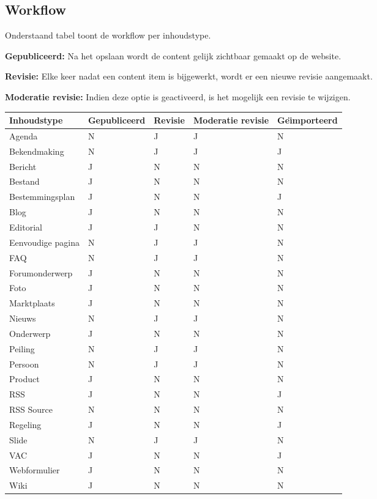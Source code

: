 \clearpage
\subsection{Workflow}\label{workflow}

Onderstaand tabel toont de workflow per inhoudstype. 

\textbf{Gepubliceerd:} Na het opslaan wordt de content gelijk zichtbaar gemaakt op de website.

\textbf{Revisie:} Elke keer nadat een content item is bijgewerkt, wordt er een nieuwe revisie aangemaakt.

\textbf{Moderatie revisie:} Indien deze optie is geactiveerd, is het mogelijk een revisie te wijzigen.

\begin{tabularx}{\textwidth}{ | p{5cm} |X|X|X|X| }
  \hline
  Inhoudstype & Gepubliceerd & Revisie & Moderatie revisie & Ge{\"\i}mporteerd \\ \hline
  Agenda & N & J  & J & N  \\ \hline
  Bekendmaking & N & J  & J & J  \\ \hline
  Bericht  & J & N  & N & N  \\ \hline
  Bestand  & J & N  & N & N  \\ \hline
  Bestemmingsplan  & J & N  & N & J  \\ \hline
  Blog  & J & N  & N & N  \\ \hline
  Editorial  & J & J  & N & N  \\ \hline
  Eenvoudige pagina  & N & J  & J & N  \\ \hline
  FAQ  & N & J  & J & N  \\ \hline
  Forumonderwerp  & J & N  & N & N  \\ \hline
  Foto  & J & N  & N & N  \\ \hline
  Marktplaats  & J & N  & N & N  \\ \hline
  Nieuws  & N & J  & J & N  \\ \hline
  Onderwerp  & J & N  & N & N  \\ \hline
  Peiling  & N & J  & J & N  \\ \hline
  Persoon  & N & J  & J & N  \\ \hline
  Product  & J & N  & N & N  \\ \hline
  RSS  & J & N  & N & J  \\ \hline
  RSS Source  & N & N  & N & N  \\ \hline
  Regeling  & J & N  & N & J  \\ \hline
  Slide  & N & J  & J & N  \\ \hline
  VAC  & J & N  & N & J  \\ \hline
  Webformulier  & J & N  & N & N  \\ \hline
  Wiki  & J & N  & N & N  \\ \hline
\end{tabularx}